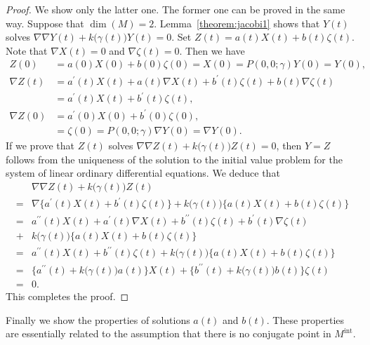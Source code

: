 \documentclass[a4paper,11pt,reqno]{amsart}
\numberwithin{equation}{section}
\theoremstyle{definition}
\theoremstyle{remark}
\begin{document}
%
%
\begin{proof}
We show only the latter one. The former one can be proved in the same way. 
Suppose that $\operatorname{dim}(M)=2$. 
Lemma~\ref{theorem:jacobi1} shows that $Y(t)$ solves 
$\nabla\nabla{Y(t)}+k\bigl(\gamma(t)\bigr)Y(t)=0$. 
Set $Z(t)=a(t)X(t)+b(t)\zeta(t)$. 
Note that $\nabla{X}(t)=0$ and $\nabla{\zeta}(t)=0$. 
Then we have 
%
%
\begin{align*}
  Z(0)
& =
  a(0)X(0)+b(0)\zeta(0)=X(0)=P(0,0;\gamma)Y(0)=Y(0),
\\
  \nabla{Z}(t)
& =
  a^\prime(t)X(t)+a(t)\nabla{X}(t)+b^\prime(t)\zeta(t)+b(t)\nabla\zeta(t)
\\
& =
  a^\prime(t)X(t)+b^\prime(t)\zeta(t),
\\
  \nabla{Z}(0)
& =
  a^\prime(0)X(0)+b^\prime(0)\zeta(0), 
\\
& =
  \zeta(0)
  =
  P(0,0;\gamma)\nabla{Y(0)}=\nabla{Y(0)}. 
\end{align*}
%
%
If we prove that $Z(t)$ solves 
$\nabla\nabla{Z(t)}+k\bigl(\gamma(t)\bigr)Z(t)=0$, 
then $Y=Z$ follows from the uniqueness of the solution to the initial value problem for the system of linear ordinary differential equations. 
We deduce that 
%
%
\begin{align*}
& \nabla\nabla{Z(t)}+k\bigl(\gamma(t)\bigr)Z(t)
\\
  =
& \nabla\{a^\prime(t)X(t)+b^\prime(t)\zeta(t)\}
  +
  k\bigl(\gamma(t)\bigr)\{a(t)X(t)+b(t)\zeta(t)\}
\\
  =
& a^{\prime\prime}(t)X(t)+a^\prime(t)\nabla{X(t)}
  +
  b^{\prime\prime}(t)\zeta(t)+b^\prime(t)\nabla\zeta(t)
\\
  +
& k\bigl(\gamma(t)\bigr)\{a(t)X(t)+b(t)\zeta(t)\}
\\
  =
& a^{\prime\prime}(t)X(t)+b^{\prime\prime}(t)\zeta(t)
  +
  k\bigl(\gamma(t)\bigr)\{a(t)X(t)+b(t)\zeta(t)\}
\\
  =
& \{a^{\prime\prime}(t)+k\bigl(\gamma(t)\bigr)a(t)\}X(t)
  +
  \{b^{\prime\prime}(t)+k\bigl(\gamma(t)\bigr)b(t)\}\zeta(t)
\\
  =
& 0.
\end{align*}
%
%
This completes the proof. 
\end{proof}
%
%
Finally we show the properties of solutions $a(t)$ and $b(t)$.  
These properties are essentially related to the assumption that there is no conjugate point in $M^\text{int}$.  
%
%
\end{document}
